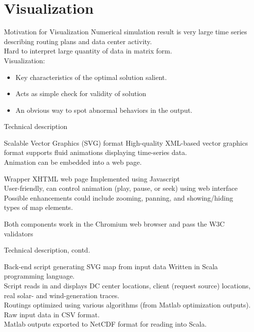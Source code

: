 \documentclass[xcolor=dvipsnames]{beamer}
\begin{document}
\section{Visualization}
\begin{frame}{Motivation for Visualization}
Numerical simulation result is very large time series describing routing plans and data center activity. \\
\vspace{2mm}
Hard to interpret large quantity of data in matrix form. \\
\vspace{2mm}
Visualization:  
	\begin{itemize}
	\item Key characteristics of the optimal solution salient.
	\item Acts as simple check for validity of solution
	\item An obvious way to spot abnormal behaviors in the output.
	\end{itemize}
\end{frame}
\begin{frame}{Technical description}
 	\begin{block}{Scalable Vector Graphics (SVG) format}
	High-quality XML-based vector graphics format supports fluid animations displaying time-series data. \\ 
	Animation can be embedded into a web page.
	\begin{block}{Wrapper XHTML web page} 
	Implemented using Javascript \\	
	User-friendly, can control animation (play, pause, or seek) using web interface \\
	Possible enhancements could include zooming, panning, and showing/hiding types of map elements.
	\begin{block}{Both components work in the Chromium web browser and pass the W3C validators}
	\end{block}
	\end{block}
	\end{block}
\end{frame}
\begin{frame}{Technical description, contd.}
	\begin{block}{Back-end script generating SVG map from input data}
	Written in Scala programming language. \\
	Script reads in and displays DC center locations, client (request source) locations, real solar- and wind-generation traces. \\
	Routings optimized using various algorithms (from Matlab optimization outputs). \\
	Raw input data in CSV format.\\
	Matlab outputs exported to NetCDF format for reading into Scala.
	\end{block}

\end{frame}
\end{document}

